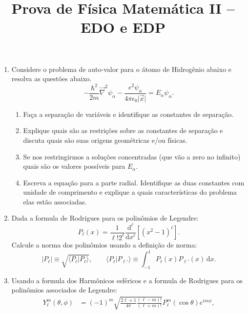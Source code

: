 \newif\ifuseseminar
\useseminartrue


\title{Prova de Física Matemática II -- EDO e EDP}



\begin{enumerate}
	\item Considere o problema de auto-valor para o átomo de Hidrogênio abaixo e resolva
	      as questões abaixo.
	      \begin{equation}
		      -\frac{\hbar^2}{2m}\vec{\nabla}^2\psi_\alpha-\frac{e^2\psi_\alpha}{4\pi\epsilon_0\vert\vec{x}\vert}=E_\alpha\psi_\alpha.
	      \end{equation}
	      \begin{enumerate}
		      \item Faça a separação de variáveis e identifique as constantes de
		            separação.
		      \item Explique quais são as restrições sobre as constantes de separação e
		            discuta quais são suas origens geométricas e/ou físicas.
		      \item Se nos restringirmos a soluções concentradas (que vão a zero no
		            infinito) quais são os valores possíveis para $E_\alpha$.
		      \item Escreva a equação para a parte radial. Identifique as duas
		            constantes com unidade de comprimento e explique a quais características
		            do problema elas estão associadas.
	      \end{enumerate}
	\item Dada a formula de Rodrigues para os polinômios de Legendre:
	      \begin{equation}
		      P_\ell(x) = \frac{1}{\ell!2^\ell}\frac{\mathrm{d}^\ell}{\mathrm{d}x^\ell}\left[\left(x^2-1\right)^\ell\right].
	      \end{equation}
	      Calcule a norma dos polinômios usando a definição de norma:
	      \begin{equation}
		      \left|P_\ell\right| \equiv \sqrt{\langle P_\ell|P_{\ell}\rangle},\qquad \langle P_\ell|P_{\ell'}\rangle \equiv \int_{-1}^1 P_\ell(x)P_{\ell'}(x)\,\mathrm{d}x.
	      \end{equation}
	\item Usando a formula dos Harmônicos esféricos e a formula de Rodrigues para os
	      polinômios associados de Legendre:
	      \begin{align}
		      Y_\ell^m(\theta,\phi) & = (-1)^m\sqrt{\frac{2\ell+1}{4\pi}\frac{(\ell-m)!}{(\ell+m)!}}P_\ell^m(\cos\theta)e^{im\phi},           \\

\end{align}
\end{enumerate}
